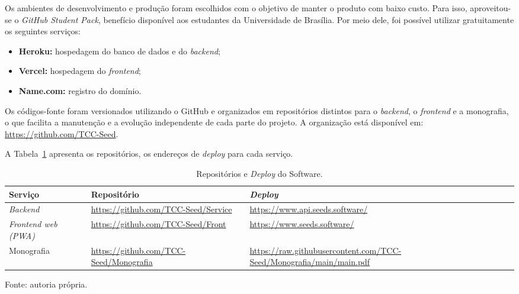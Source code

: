 Os ambientes de desenvolvimento e produção foram escolhidos com o objetivo de manter o produto com baixo custo. Para isso, aproveitou-se o \textit{GitHub Student Pack}, benefício disponível aos estudantes da Universidade de Brasília. Por meio dele, foi possível utilizar gratuitamente os seguintes serviços:

\begin{itemize}
    \item \textbf{Heroku:} hospedagem do banco de dados e do \textit{backend};
    \item \textbf{Vercel:} hospedagem do \textit{frontend};
    \item \textbf{Name.com:} registro do domínio.
\end{itemize}

Os códigos-fonte foram versionados utilizando o GitHub e organizados em repositórios distintos para o \textit{backend}, o \textit{frontend} e a monografia, o que facilita a manutenção e a evolução independente de cada parte do projeto. A organização está disponível em: \url{https://github.com/TCC-Seed}.

A Tabela~\ref{tab:repositorios} apresenta os repositórios, os endereços de \textit{deploy} para cada serviço.

\renewcommand{\arraystretch}{1.5}
\begin{table}[H]
    \centering
    \caption{Repositórios e \textit{Deploy} do Software.}
    \label{tab:repositorios}

    \begin{tabularx}{\textwidth}{|l|X|X|}
        \hline
        \textbf{Serviço} & \textbf{Repositório} & \textbf{\textit{Deploy}} \\
        \hline
        \textit{Backend} & \footnotesize\url{https://github.com/TCC-Seed/Service} & \footnotesize\url{https://www.api.seeds.software/} \\
        \hline
        \textit{Frontend web (PWA)} & \footnotesize\url{https://github.com/TCC-Seed/Front} & \footnotesize\url{https://www.seeds.software/} \\
        \hline
        Monografia & \footnotesize\url{https://github.com/TCC-Seed/Monografia} & \footnotesize\url{https://raw.githubusercontent.com/TCC-Seed/Monografia/main/main.pdf} \\
        \hline
    \end{tabularx}

    \vspace{0.5em}
    \small Fonte: autoria própria.
\end{table}

